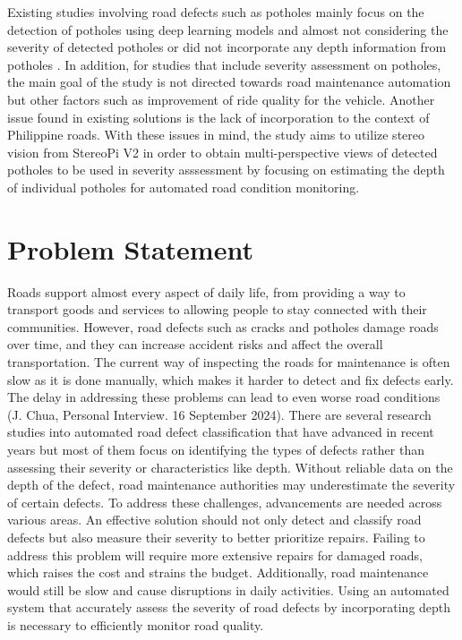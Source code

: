 Existing studies involving road defects such as potholes mainly focus on the detection of potholes using deep learning models and almost not considering the severity of detected potholes or did not incorporate any depth information from potholes \cite{ha2022,kumar2024,bibi2021}. In addition, for studies that include severity assessment on potholes, the main goal of the study is not directed towards road maintenance automation but other factors such as improvement of ride quality for the vehicle. Another issue found in existing solutions is the lack of incorporation to the context of Philippine roads. With these issues in mind, the study aims to utilize stereo vision from StereoPi V2 in order to obtain multi-perspective views of detected potholes to be used in severity asssessment by focusing on estimating the depth of individual potholes for automated road condition monitoring.


\section{Problem Statement}
Roads support almost every aspect of daily life, from providing a way to transport goods and services to allowing people to stay connected with their communities. However, road defects such as cracks and potholes damage roads over time, and they can increase accident risks and affect the overall transportation. The current way of inspecting the roads for maintenance is often slow as it is done manually, which makes it harder to detect and fix defects early. The delay in addressing these problems can lead to even worse road conditions (J. Chua, Personal Interview. 16 September 2024). There are several research studies into automated road defect classification that have advanced in recent years but most of them focus on identifying the types of defects rather than assessing their severity or characteristics like depth. Without reliable data on the depth of the defect, road maintenance authorities may underestimate the severity of certain defects. To address these challenges, advancements are needed across various areas. An effective solution should not only detect and classify road defects but also measure their severity to better prioritize repairs. Failing to address this problem will require more extensive repairs for damaged roads, which raises the cost and strains the budget. Additionally, road maintenance would still be slow and cause disruptions in daily activities. Using an automated system that accurately assess the severity of road defects by incorporating depth is necessary to efficiently monitor road quality.


